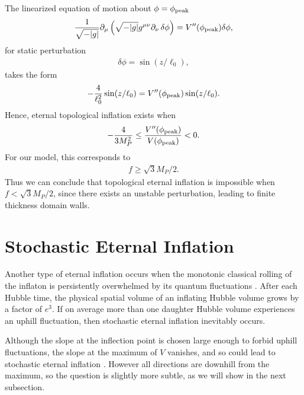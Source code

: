 \documentclass[aps,amsfonts,amsmath,prd,preprint,nofootinbib]{revtex4}
\newcommand{\Mp}{{M_{P}}}
\newcommand{\MMp}{{M_P^2}}
\begin{document}
\begin{appendix}
The linearized equation of motion about $\phi = \phi_{\rm peak}$
\begin{align}
\frac{1}{\sqrt{-|g|}}\partial_\mu\left(\sqrt{-|g|}g^{\mu\nu}\partial_\nu\, \delta\phi\right) = V''(\phi_{\rm peak}) \delta\phi,
\end{align}
for static perturbation 
\begin{align}
\delta\phi = \sin(z/\ell_0),
\end{align}
takes the form
\begin{align}
-\frac{4}{\ell_0^2}\sin(z/\ell_0) = V''(\phi_{\rm peak})\sin(z/\ell_0).
\end{align}
Hence, eternal topological inflation exists when
\begin{align}
 -\frac{4}{3\MMp} \leq \frac{V''(\phi_{\rm peak})}{V(\phi_{\rm peak})} < 0.
\end{align}
For our model, this corresponds to
\begin{align}
f \geq \sqrt{3}\Mp/2.
\end{align}
Thus we can conclude that topological eternal inflation is impossible when $f < \sqrt{3}\Mp/2$,
since there exists an unstable perturbation, leading to finite thickness domain walls.




\section{Stochastic Eternal Inflation}\label{sec:stoc}
Another type of eternal inflation occurs when the monotonic classical rolling of the inflaton is persistently overwhelmed by its quantum fluctuations \cite{steinhardt1982,Vilenkin:1983xq,Linde:1983gd}.  
After each Hubble time, the physical spatial volume of an inflating Hubble volume grows by a factor of $e^3$.  If on average more than one daughter Hubble volume
experiences an uphill fluctuation, then stochastic eternal inflation inevitably occurs.


Although the slope at the inflection point is chosen large enough to forbid uphill fluctuations, the slope at the maximum of $V$ vanishes, and so could lead to stochastic eternal inflation \cite{Barenboim:2016mmw}.  
However all directions are downhill from the maximum, so the question is slightly more subtle, as we will show in the next subsection.


\end{appendix}
\end{document}

